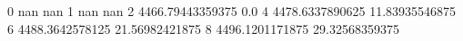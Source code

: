 0 nan nan
1 nan nan
2 4466.79443359375 0.0
4 4478.6337890625 11.83935546875
6 4488.3642578125 21.56982421875
8 4496.1201171875 29.32568359375

